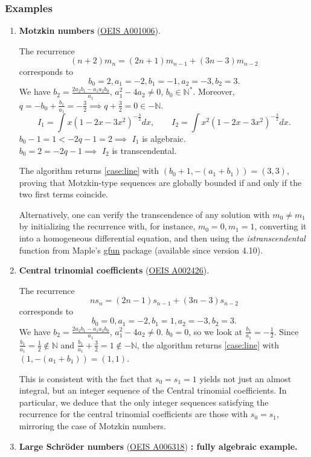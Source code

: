 \documentclass[11pt]{article}
\theoremstyle{definition}
\theoremstyle{plain}
\theoremstyle{remark}
\begin{document}
\subsubsection{Examples}
\begin{enumerate}
\item \textbf{Motzkin numbers} (\href{https://oeis.org/A001006}{OEIS 
A001006}).

The recurrence
\[(n+2)m_n = (2n+1)m_{n-1}+(3n-3)m_{n-2}\]
corresponds to
\[b_0=2,a_1=-2,b_1=-1,a_2=-3,b_2=3.\]
We have $b_2 = \frac{2a_2b_1-a_1a_2b_0}{a_1}$, $a_1^2-4a_2\neq0$, $b_0\in\mathbb{N}^*$. Moreover, $q=-b_0+\frac{b_1}{a_1} = -\frac{3}{2} \implies q+\frac{3}{2}=0\in-\mathbb{N}$. 
\[I_1 = \int{x(1-2x-3x^2)^{-\frac{3}{2}}dx}, \qquad I_2 = \int{x^2(1-2x-3x^2)^{-\frac{3}{2}}dx}.\]
$b_0-1=1 < -2q-1 = 2 \implies$ $I_1$ is algebraic.\\
$b_0=2 = -2q-1 \implies$ $I_2$ is transcendental.

The algorithm returns \cref{case:line} with $(b_0+1,-(a_1+b_1)) = (3,3)$, proving that Motzkin-type sequences are globally bounded if and only if the two first terms coincide.

Alternatively, one can verify the transcendence of any solution with $m_0\neq m_1$ by initializing the recurrence with, for instance, $m_0=0,m_1=1$, converting it into a homogeneous differential equation, and then using the \textit{istranscendental} function from Maple’s \href{https://perso.ens-lyon.fr/bruno.salvy/software/the-gfun-package/}{gfun} package (available since version 4.10).
\item \textbf{Central trinomial coefficients } (\href{https://oeis.org/A002426}{OEIS A002426}).

The recurrence
\[ns_n = (2n-1)s_{n-1} + (3n-3)s_{n-2}\]
corresponds to
\[b_0=0,a_1=-2,b_1=1,a_2=-3,b_2=3.\]
We have $b_2 = \frac{2a_2b_1-a_1a_2b_0}{a_1}$, $a_1^2-4a_2\neq0$. $b_0=0$, so we look at $\frac{b_1}{a_1}=-\frac{1}{2}$. Since $\frac{b_1}{a_1} = \frac{1}{2} \notin \mathbb{N}$ and $\frac{b_1}{a_1}+\frac{3}{2} = 1 \notin -\mathbb{N}$, the algorithm returns \cref{case:line} with $(1,-(a_1+b_1)) = (1,1)$.

This is consistent with the fact that $s_0 = s_1 = 1$ yields not just an almost integral, but an integer sequence of the Central trinomial coefficients. In particular, we deduce that the only integer sequences satisfying the recurrence for the central trinomial coefficients are those with $s_0=s_1$, mirroring the case of Motzkin numbers.
\item \textbf{Large Schröder numbers} (\href{https://oeis.org/A006318}{OEIS A006318}) \textbf{: fully algebraic example.}


\end{enumerate}
\end{document}
